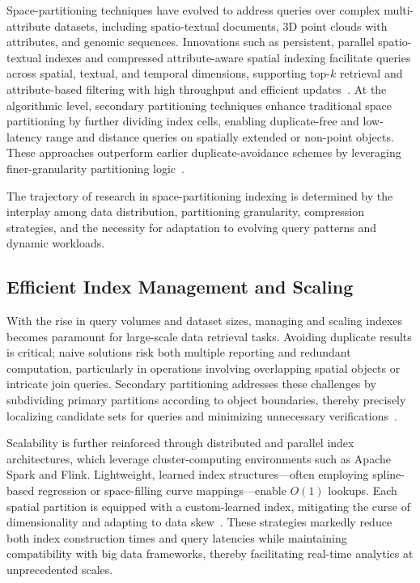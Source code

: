 Space-partitioning techniques have evolved to address queries over complex multi-attribute datasets, including spatio-textual documents, 3D point clouds with attributes, and genomic sequences. Innovations such as persistent, parallel spatio-textual indexes and compressed attribute-aware spatial indexing facilitate queries across spatial, textual, and temporal dimensions, supporting top-$k$ retrieval and attribute-based filtering with high throughput and efficient updates~\cite{ref50,ref51,ref75,ref98,ref114,ref118}. At the algorithmic level, secondary partitioning techniques enhance traditional space partitioning by further dividing index cells, enabling duplicate-free and low-latency range and distance queries on spatially extended or non-point objects. These approaches outperform earlier duplicate-avoidance schemes by leveraging finer-granularity partitioning logic~\cite{ref114}.

The trajectory of research in space-partitioning indexing is determined by the interplay among data distribution, partitioning granularity, compression strategies, and the necessity for adaptation to evolving query patterns and dynamic workloads.

\subsection{Efficient Index Management and Scaling}

With the rise in query volumes and dataset sizes, managing and scaling indexes becomes paramount for large-scale data retrieval tasks. Avoiding duplicate results is critical; naive solutions risk both multiple reporting and redundant computation, particularly in operations involving overlapping spatial objects or intricate join queries. Secondary partitioning addresses these challenges by subdividing primary partitions according to object boundaries, thereby precisely localizing candidate sets for queries and minimizing unnecessary verifications~\cite{ref114}.

Scalability is further reinforced through distributed and parallel index architectures, which leverage cluster-computing environments such as Apache Spark and Flink. Lightweight, learned index structures---often employing spline-based regression or space-filling curve mappings---enable $O(1)$ lookups. Each spatial partition is equipped with a custom-learned index, mitigating the curse of dimensionality and adapting to data skew~\cite{ref51,ref111}. These strategies markedly reduce both index construction times and query latencies while maintaining compatibility with big data frameworks, thereby facilitating real-time analytics at unprecedented scales.

